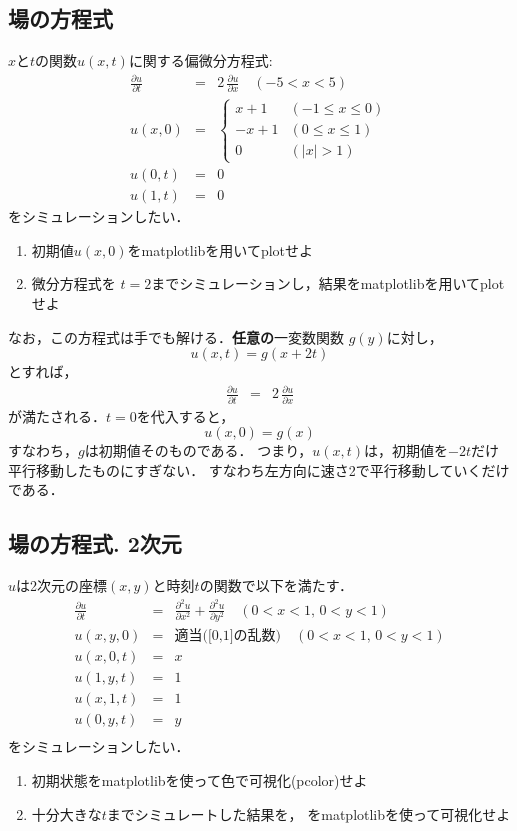 \documentclass[10pt,dvipdfmx]{article}
\begin{document}
\newpage

\section{}

\subsection{{\scriptsize 場の方程式}}
$x$と$t$の関数$u(x,t)$に関する偏微分方程式:
\begin{eqnarray*}
\frac{\partial u}{\partial t} & = & 2\, \frac{\partial u}{\partial x} 
\quad (-5 < x < 5) \\
u(x, 0) & = & 
\left\{ 
\begin{array}{ll}
 x + 1 & (-1 \leq x \leq 0) \\
-x + 1 & (0 \leq x \leq 1) \\
0      & (|x| > 1)
\end{array}
\right. \\
u(0, t) & = & 0 \\
u(1, t) & = & 0
\end{eqnarray*}
をシミュレーションしたい．
\begin{enumerate}
\item 初期値$u(x, 0)$をmatplotlibを用いてplotせよ
\item 微分方程式を
$t = 2$までシミュレーションし，結果をmatplotlibを用いてplotせよ
\end{enumerate}

なお，この方程式は手でも解ける．{\bf 任意の}一変数関数
$g(y)$に対し，
\[ u(x, t) = g(x + 2 t) \]
とすれば，
\begin{eqnarray*}
\frac{\partial u}{\partial t} & = & 2\, \frac{\partial u}{\partial x} 
\end{eqnarray*}
が満たされる．$t=0$を代入すると，
\[ u(x, 0) = g(x) \]
すなわち，$g$は初期値そのものである．
つまり，$u(x, t)$は，初期値を$-2t$だけ平行移動したものにすぎない．
すなわち左方向に速さ2で平行移動していくだけである．

\subsection{{\scriptsize 場の方程式. 2次元}}
$u$は2次元の座標$(x,y)$と時刻$t$の関数で以下を満たす．
\begin{eqnarray*}
\frac{\partial u}{\partial t} & = & 
\frac{\partial^2 u}{\partial x^2} +
\frac{\partial^2 u}{\partial y^2} 
\quad (0 < x < 1,\, 0 < y < 1) \\
u(x, y, 0) & = & \mbox{適当([0,1]の乱数)} 
\quad (0 < x < 1,\, 0 < y < 1) \\
u(x, 0, t) & = & x \\
u(1, y, t) & = & 1 \\
u(x, 1, t) & = & 1 \\
u(0, y, t) & = & y \\
\end{eqnarray*}
をシミュレーションしたい．

\begin{enumerate}
\item 初期状態をmatplotlibを使って色で可視化(pcolor)せよ
\item 十分大きな$t$までシミュレートした結果を，
をmatplotlibを使って可視化せよ
\end{enumerate}
\end{document}

